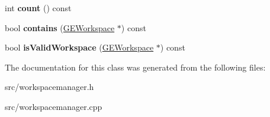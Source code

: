 \begin{DoxyCompactItemize}
int {\bfseries count} () const
\item 
\mbox{\label{class_workspace_manager_a3cc9b948cfd3e731d76310137ec092c9}} 
bool {\bfseries contains} (\hyperlink{class_g_e_workspace}{G\+E\+Workspace} $\ast$) const
\item 
\mbox{\label{class_workspace_manager_aba77e63e85bbf08a02c91636023304c0}} 
bool {\bfseries is\+Valid\+Workspace} (\hyperlink{class_g_e_workspace}{G\+E\+Workspace} $\ast$) const
\end{DoxyCompactItemize}


The documentation for this class was generated from the following files\+:\begin{DoxyCompactItemize}
\item 
src/workspacemanager.\+h\item 
src/workspacemanager.\+cpp\end{DoxyCompactItemize}
